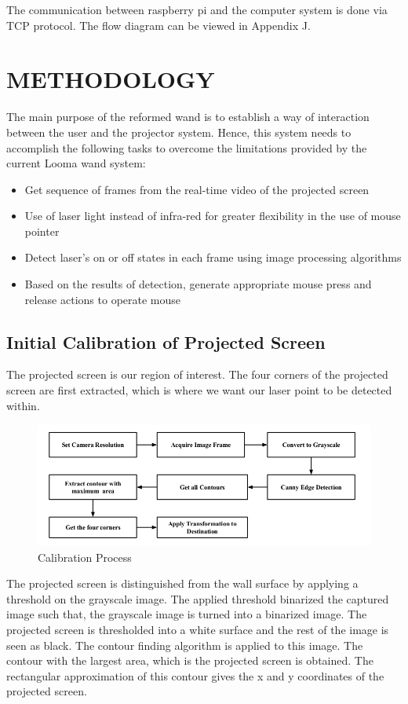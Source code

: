 \documentclass[12pt, a4paper]{article}
\begin{document}
The communication between raspberry pi and the computer system is done via TCP protocol. The flow diagram can be viewed in Appendix J.

\clearpage
\section{METHODOLOGY}

The main purpose of the reformed wand is to establish a way of interaction between the user and the projector system. Hence, this system needs to accomplish the following tasks to overcome the limitations provided by the current Looma wand system:
\begin{itemize}
\item Get sequence of frames from the real-time video of the projected screen
\item Use of laser light instead of infra-red for greater flexibility in the use of mouse pointer
\item Detect laser’s on or off states in each frame using image processing algorithms
\item Based on the results of detection, generate appropriate mouse press and release actions to operate mouse
\end{itemize}



\subsection{Initial Calibration of Projected Screen}
	 The projected screen is our region of interest. The four corners of the projected screen are first extracted, which is where we want our laser point to be detected within. 


\begin{figure}[htp]
	\centering
	\includegraphics[scale=0.50]{Calibration.png}
	\caption{Calibration Process}
	\label{}
\end{figure}
	 
    The projected screen is distinguished from the wall surface by applying a threshold on the grayscale image. The applied threshold binarized the captured image such that, the grayscale image is turned into a binarized image. The projected screen is thresholded into a white surface and the rest of the image is seen as black. The contour finding algorithm is applied to this image. The contour with the largest area, which is the projected screen is obtained. The rectangular approximation of this contour gives the x and y coordinates of the projected screen. 
 
\end{document}
